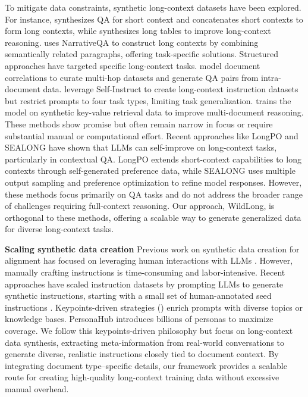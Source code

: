To mitigate data constraints, synthetic long-context datasets have been explored. For instance, \cite{an2024make} synthesizes QA for short context and concatenates short contexts to form long contexts, while \cite{zhao2024longskywork} synthesizes long tables to improve long-context reasoning. \cite{xu2024chatqa} uses NarrativeQA to construct long contexts by combining semantically related paragraphs, offering task-specific solutions.
Structured approaches have targeted specific long-context tasks. \cite{chen2024essential} model document correlations to curate multi-hop datasets and generate QA pairs from intra-document data. \cite{bai2024longalign} leverage Self-Instruct to create long-context instruction datasets but restrict prompts to four task types, limiting task generalization.
\cite{artificialneedles} trains the model on synthetic key-value retrieval data to improve multi-document reasoning. These methods show promise but often remain narrow in focus or require substantial manual or computational effort.
Recent approaches like LongPO \citep{chen2025longpo} and SEALONG \citep{li2024sealong} have shown that LLMs can self-improve on long-context tasks, particularly in contextual QA. LongPO extends short-context capabilities to long contexts through self-generated preference data, while SEALONG uses multiple output sampling and preference optimization to refine model responses. However, these methods focus primarily on QA tasks and do not address the broader range of challenges requiring full-context reasoning. Our approach, WildLong, is orthogonal to these methods, offering a scalable way to generate generalized data for diverse long-context tasks. 

\textbf{Scaling synthetic data creation}
Previous work on synthetic data creation for alignment has focused on leveraging human interactions with LLMs \citep{DatabricksBlog2023DollyV2, zhao2024wildchat, zheng2024lmsyschatm, pf2023openassistant}. However, manually crafting instructions is time-consuming and labor-intensive. Recent approaches have scaled instruction datasets by prompting LLMs to generate synthetic instructions, starting with a small set of human-annotated seed instructions \citep{yu2023metamath, wang2023selfinstrct, taori2023stanfordalapca, xu2024wizardlm, sun2024principle}.
Keypoints-driven strategies (\cite{li2024syntheticdataalmostscratch, tangmathscale, huang2024key}) enrich prompts with diverse topics or knowledge bases. PersonaHub \cite{ge2024personahub} introduces billions of personas to maximize coverage.
We follow this keypoints-driven philosophy but focus on long-context data synthesis, extracting meta-information from real-world conversations to generate diverse, realistic instructions closely tied to document context. By integrating document type–specific details, our framework provides a scalable route for creating high-quality long-context training data without excessive manual overhead.
